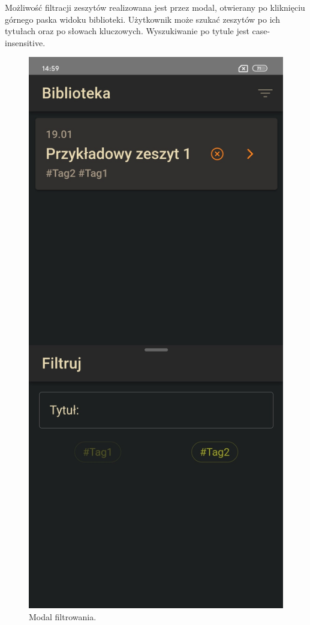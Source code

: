 Możliwość filtracji zeszytów realizowana jest przez modal, otwierany po kliknięciu górnego paska widoku biblioteki.
Użytkownik może szukać zeszytów po ich tytułach oraz po słowach kluczowych. Wyszukiwanie po tytule jest case-insensitive.
\begin{figure}[H]
	\begin{center}
		\includegraphics[scale=0.2]{media/FilterModal.jpg}
	\end{center}
	\caption{Modal filtrowania.}
	\label{rys:filter-modal}
\end{figure}

